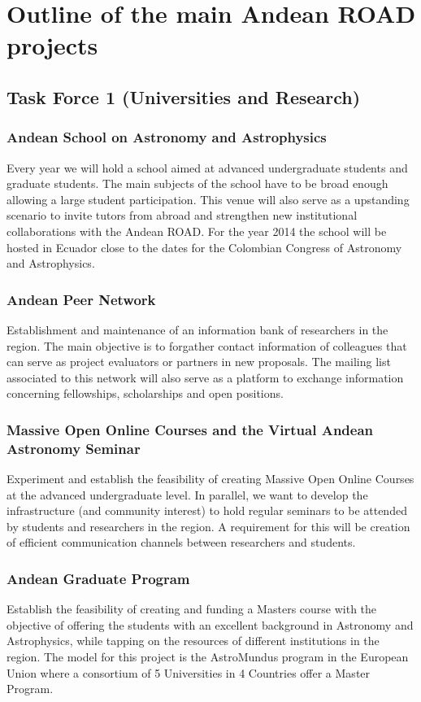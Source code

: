 \documentclass[12pt]{article}
\begin{document}
\section{Outline of the main Andean ROAD projects}

\subsection{Task Force 1 (Universities and Research)}

\subsubsection*{Andean School on Astronomy and Astrophysics}
Every year we will hold a school aimed at advanced undergraduate
students and graduate students. The main subjects of the school have
to be broad enough allowing a large student participation. This venue
will also serve as a upstanding scenario to invite tutors from abroad
and strengthen new institutional collaborations with the Andean
ROAD. For the year 2014 the school will be hosted in Ecuador close to
the dates for the Colombian Congress of Astronomy and Astrophysics. 

\subsubsection*{Andean Peer Network}
Establishment and maintenance of an information bank of researchers in
the region. The main objective is to forgather contact information of
colleagues that can serve as project evaluators or partners in new
proposals. The mailing list associated to this network will also serve
as a platform to exchange information concerning fellowships,
scholarships and open positions. 

\subsubsection*{Massive Open Online Courses and the Virtual Andean
  Astronomy Seminar} 
Experiment and establish the feasibility of creating Massive Open
Online Courses at the advanced undergraduate level. In parallel, we
want to develop the infrastructure (and community interest) to hold
regular seminars to be attended by students and researchers in the
region. A requirement for this will be creation of efficient
communication channels between researchers and students. 

\subsubsection*{Andean Graduate Program}
Establish the feasibility of creating and funding a Masters course
with the objective of offering the students with an excellent
background in Astronomy and Astrophysics, while tapping on the
resources of different institutions in the region. The model for this
project is the AstroMundus program in the European Union where a
consortium of 5 Universities in 4 Countries offer a Master Program. 
\end{document}
